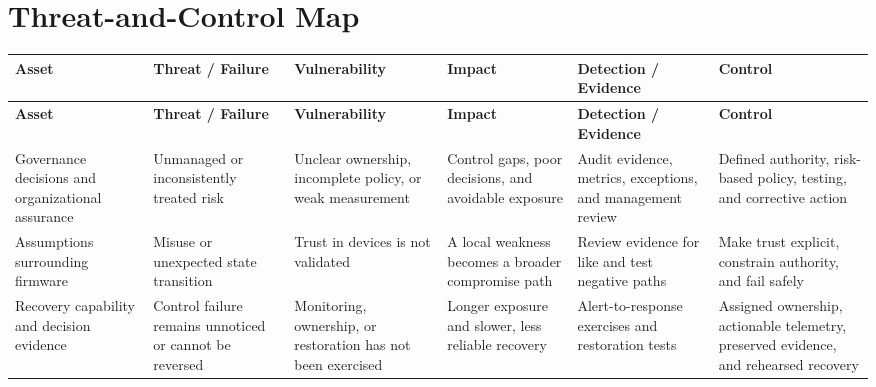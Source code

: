 \documentclass[11pt,letterpaper]{article}
\begin{document}
\section*{Threat-and-Control Map}
\begingroup\scriptsize\setlength{\tabcolsep}{2pt}
\begin{longtable}{>{\raggedright\arraybackslash}p{}>{\raggedright\arraybackslash}p{}>{\raggedright\arraybackslash}p{}>{\raggedright\arraybackslash}p{}>{\raggedright\arraybackslash}p{}>{\raggedright\arraybackslash}p{}}
\toprule\rowcolor{Navy}\color{white}\textbf{Asset} & \color{white}\textbf{Threat / Failure} & \color{white}\textbf{Vulnerability} & \color{white}\textbf{Impact} & \color{white}\textbf{Detection / Evidence} & \color{white}\textbf{Control}\\\midrule
\endfirsthead
\toprule\rowcolor{Navy}\color{white}\textbf{Asset} & \color{white}\textbf{Threat / Failure} & \color{white}\textbf{Vulnerability} & \color{white}\textbf{Impact} & \color{white}\textbf{Detection / Evidence} & \color{white}\textbf{Control}\\\midrule
\endhead
Governance decisions and organizational assurance & Unmanaged or inconsistently treated risk & Unclear ownership, incomplete policy, or weak measurement & Control gaps, poor decisions, and avoidable exposure & Audit evidence, metrics, exceptions, and management review & Defined authority, risk-based policy, testing, and corrective action\\\midrule
Assumptions surrounding firmware & Misuse or unexpected state transition & Trust in devices is not validated & A local weakness becomes a broader compromise path & Review evidence for like and test negative paths & Make trust explicit, constrain authority, and fail safely\\\midrule
Recovery capability and decision evidence & Control failure remains unnoticed or cannot be reversed & Monitoring, ownership, or restoration has not been exercised & Longer exposure and slower, less reliable recovery & Alert-to-response exercises and restoration tests & Assigned ownership, actionable telemetry, preserved evidence, and rehearsed recovery\\\midrule
\bottomrule
\end{longtable}
\endgroup
\end{document}

